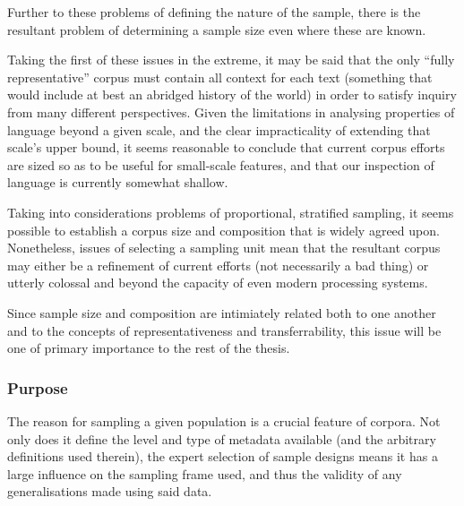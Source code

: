 

Further to these problems of defining the nature of the sample, there is the resultant problem of determining a sample size even where these are known.  

Taking the first of these issues in the extreme, it may be said that the only ``fully representative'' corpus must contain all context for each text (something that would include at best an abridged history of the world) in order to satisfy inquiry from many different perspectives.  Given the limitations in analysing properties of language beyond a given scale, and the clear impracticality of extending that scale's upper bound, it seems reasonable to conclude that current corpus efforts are sized so as to be useful for small-scale features, and that our inspection of language is currently somewhat shallow.

Taking into considerations problems of proportional, stratified sampling, it seems possible to establish a corpus size and composition that is widely agreed upon.  Nonetheless, issues of selecting a sampling unit mean that the resultant corpus may either be a refinement of current efforts (not necessarily a bad thing) or utterly colossal and beyond the capacity of even modern processing systems.

Since sample size and composition are intimiately related both to one another and to the concepts of representativeness and transferrability, this issue will be one of primary importance to the rest of the thesis.





\subsubsection{Purpose}
The reason for sampling a given population is a crucial feature of corpora.  Not only does it define the level and type of metadata available (and the arbitrary definitions used therein), the expert selection of sample designs means it has a large influence on the sampling frame used, and thus the validity of any generalisations made using said data.

